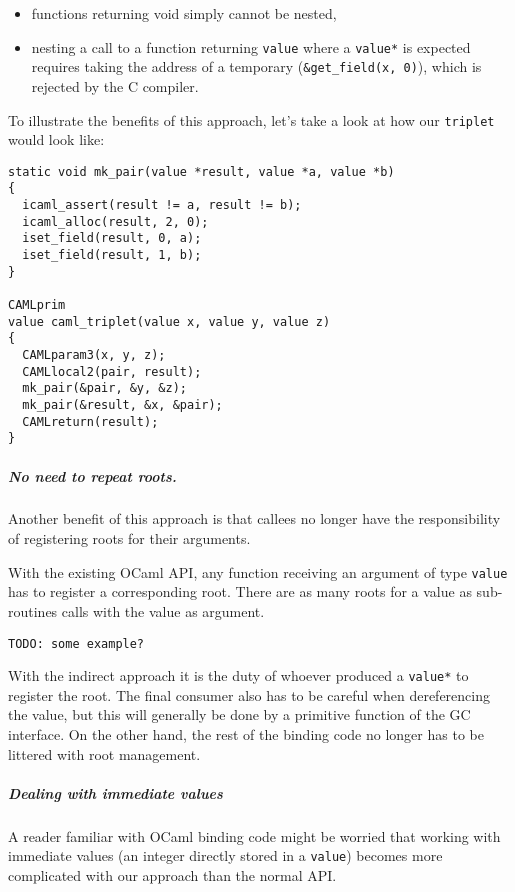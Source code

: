 \documentclass[a4paper]{easychair}
\begin{document}
\begin{itemize}
\item functions returning void simply cannot be nested,
\item nesting a call to a function returning \texttt{value} where a
      \texttt{value*} is expected requires taking the address of a temporary
      (\texttt{\&get\_field(x,\ 0)}), which is rejected by the C compiler.
\end{itemize}

To illustrate the benefits of this approach, let's take a look at how
our \texttt{triplet} would look like:

\begin{lstlisting}[]
static void mk_pair(value *result, value *a, value *b)
{
  icaml_assert(result != a, result != b);
  icaml_alloc(result, 2, 0);
  iset_field(result, 0, a);
  iset_field(result, 1, b);
}

CAMLprim
value caml_triplet(value x, value y, value z)
{
  CAMLparam3(x, y, z);
  CAMLlocal2(pair, result);
  mk_pair(&pair, &y, &z);
  mk_pair(&result, &x, &pair);
  CAMLreturn(result);
}
\end{lstlisting}

\subparagraph{No need to repeat roots.}

Another benefit of this approach is that callees no longer have the
responsibility of registering roots for their arguments.

With the existing OCaml API, any function receiving an argument of type
\texttt{value} has to register a corresponding root. There are as many
roots for a value as sub-routines calls with the value as argument.

\begin{lstlisting}[]
TODO: some example?
\end{lstlisting}

With the indirect approach it is the duty of whoever produced a
\texttt{value*} to register the root. The final consumer also has to be
careful when dereferencing the value, but this will generally be done by
a primitive function of the GC interface. On the other hand, the rest of
the binding code no longer has to be littered with root management.

\subparagraph{Dealing with immediate values}

A reader familiar with OCaml binding code might be worried that working
with immediate values (an integer directly stored in a \texttt{value})
becomes more complicated with our approach than the normal API.
\end{document}

